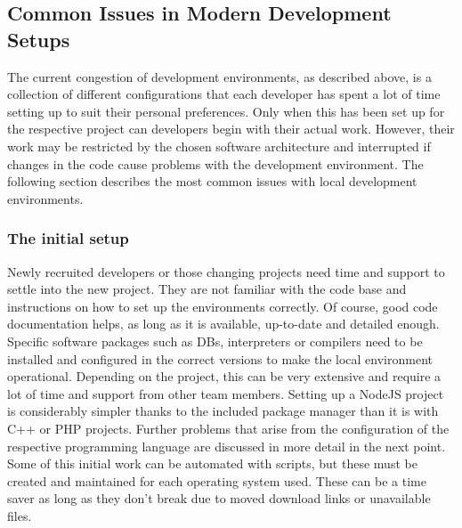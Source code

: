 \documentclass[12pt, a4paper]{article}
\begin{document}
    \subsection{Common Issues in Modern Development Setups}
    The current congestion of development environments, as described above, is a collection of different configurations that each developer has spent a lot of time setting up to suit their personal preferences. Only when this has been set up for the respective project can developers begin with their actual work. However, their work may be restricted by the chosen software architecture and interrupted if changes in the code cause problems with the development environment. The following section describes the most common issues with local development environments.

        \subsubsection{The initial setup}
        Newly recruited developers or those changing projects need time and support to settle into the new project. They are not familiar with the code base and instructions on how to set up the environments correctly. Of course, good code documentation helps, as long as it is available, up-to-date and detailed enough. Specific software packages such as \ac{DB}s, interpreters or compilers need to be installed and configured in the correct versions to make the local environment operational. Depending on the project, this can be very extensive and require a lot of time and support from other team members. Setting up a NodeJS project is considerably simpler thanks to the included package manager  than it is with C++ or PHP projects. Further problems that arise from the configuration of the respective programming language are discussed in more detail in the next point. \newline
        Some of this initial work can be automated with scripts, but these must be created and maintained for each operating system used. These can be a time saver as long as they don't break due to moved download links or unavailable files.
\end{document}
